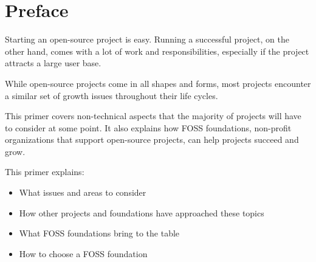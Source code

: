


\chapter*{Preface}

Starting an open-source project is easy.  Running a successful project, on the other hand, comes with a lot of work and responsibilities, especially if the project attracts a large user base.

While open-source projects come in all shapes and forms, most projects encounter a similar set of growth issues throughout their life cycles.

This primer covers non-technical aspects that the majority of projects will have to consider at some point.  It also explains how FOSS foundations, non-profit organizations that support open-source projects, can help projects succeed and grow.

This primer explains:

\begin{itemize}

\item What issues and areas to consider

\item How other projects and foundations have approached these topics

\item What FOSS foundations bring to the table

\item How to choose a FOSS foundation

\end{itemize}

